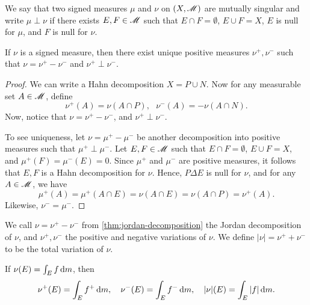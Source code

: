 \documentclass[12pt]{article} %
\begin{document}
\begin{definition}
    We say that two signed measures $\mu$ and $\nu$ on $(X, \mathscr{M})$ are mutually singular and write $\mu \perp \nu$ if there exists $E, F \in \mathscr{M}$ such that $E \cap F = \emptyset$, $E \cup F = X$, $E$ is null for $\mu$, and $F$ is null for $\nu$.
\end{definition}

\begin{theorem}\label{thm:jordan-decomposition}
    If $\nu$ is a signed measure, then there exist unique positive measures $\nu^+,\nu^-$ such that $\nu = \nu^+ - \nu^-$ and $\nu^+ \perp \nu^-$.
\end{theorem}

\begin{proof}
    We can write a Hahn decomposition $X = P \cup N$. Now for any measurable set $A \in \mathscr{M}$, define \[\nu^+(A) = \nu(A \cap P), \ \ \ \nu^-(A) = -\nu(A \cap N).\] Now, notice that $\nu = \nu^+ - \nu^-$, and $\nu^+ \perp \nu^-$.

    To see uniqueness, let $\nu = \mu^+ - \mu^-$ be another decomposition into positive measures such that $\mu^+ \perp \mu^-$. Let $E, F \in \mathscr{M}$ such that $E \cap F = \emptyset$, $E \cup F = X$, and $\mu^+(F) = \mu^-(E) = 0$. Since $\mu^+$ and $\mu^-$ are positive measures, it follows that $E, F$ is a Hahn decomposition for $\nu$. Hence, $P \Delta E$ is null for $\nu$, and for any $A \in \mathscr{M}$, we have \[\mu^+(A) = \mu^+(A \cap E) = \nu(A \cap E) = \nu(A \cap P) = \nu^+(A).\] Likewise, $\nu^- = \mu^-$.
\end{proof}

\begin{definition}
    We call $\nu = \nu^+ - \nu^-$ from \cref{thm:jordan-decomposition} the Jordan decomposition of $\nu$, and $\nu^+, \nu^-$ the positive and negative variations of $\nu$. We define $|\nu| = \nu^+ + \nu^-$ to be the total variation of $\nu$.
\end{definition}

\begin{example}
    If $\nu(E) = \int_E f \, \mathrm{d} m$, then \[\nu^+(E) = \int_E f^+ \, \mathrm{d} m, \ \ \ \nu^-(E) = \int_E f^- \, \mathrm{d} m, \ \ \ |\nu|(E) = \int_E |f| \, \mathrm{d} m.\]
\end{example}
\end{document}
